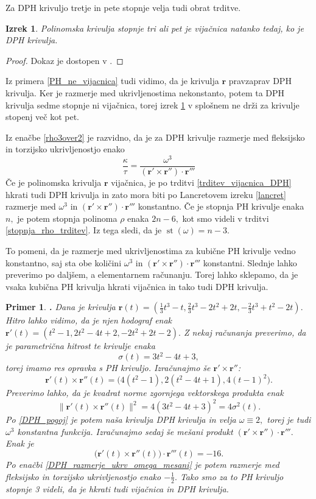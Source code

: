 \documentclass[12pt,a4paper,twoside]{article}
\theoremstyle{definition} %
\theoremstyle{plain} %
\newtheorem{izrek}[definicija]{Izrek}
\theoremstyle{primerstyle}
\newtheorem{primer}[definicija]{Primer}
\numberwithin{equation}{section}  %
\newcommand{\rV}{\mathbf{r}}
\DeclareMathOperator{\st}{st}
\begin{document}
Za DPH krivuljo tretje in pete stopnje velja tudi obrat trditve.
\begin{izrek}
	\label{DPH_helix_3ali5}
	Polinomska krivulja stopnje tri ali pet je vijačnica natanko tedaj, ko je DPH krivulja.
\end{izrek}
\begin{proof}
	Dokaz je dostopen v \cite[str.\ 121]{beltranmonterde}.
\end{proof}
Iz primera \ref{PH_ne_vijacnica} tudi vidimo, da je krivulja $\rV$ pravzaprav DPH krivulja. Ker je razmerje med ukrivljenostima nekonstanto, potem ta DPH krivulja sedme stopnje ni vijačnica, torej izrek \ref{DPH_helix_3ali5} v splošnem ne drži za krivulje stopenj več kot pet.

Iz enačbe \eqref{rho3over2} je razvidno, da je za DPH krivulje razmerje med fleksijsko in torzijsko ukrivljenostjo enako
\begin{equation}
	\label{DPH_razmerje_ukrv_omega_mesani}
	\frac{\kappa}{\tau}=\frac{\omega^3}{(\rV'\times\rV'')\cdot\rV'''}%
\end{equation}
Če je polinomska krivulja $\rV$ vijačnica, je po trditvi \ref{trditev_vijacnica_DPH} hkrati tudi DPH krivulja in zato mora biti po Lancretovem izreku \ref{lancret} razmerje med $\omega^3$ in $(\rV'\times\rV'')\cdot\rV'''$ konstantno. Če je stopnja PH krivulje enaka $n,$ je potem stopnja polinoma $\rho	$ enaka $2n-6,$ kot smo videli v trditvi \ref{stopnja_rho_trditev}. Iz tega sledi, da je $\st(\omega)=n-3.$

To pomeni, da je razmerje med ukrivljenostima za kubične PH krivulje vedno konstantno, saj sta obe količini $\omega^3$ in $(\rV'\times\rV'')\cdot\rV'''$ konstantni. Slednje lahko preverimo po daljšem, a elementarnem računanju. Torej lahko sklepamo, da je vsaka kubična PH krivulja hkrati vijačnica in tako tudi DPH krivulja.
\begin{primer}
	\textbf{.} Dana je krivulja $\rV(t)=(\frac{1}{3}t^3-t,\frac{2}{3}t^3-2t^2+2t,-\frac{2}{3}t^3+t^2-2t).$ Hitro lahko vidimo, da je njen hodograf enak $\rV'(t)=(t^2-1,2t^2-4t+2,-2t^2+2t-2).$ Z nekaj računanja preverimo, da je parametrična hitrost te krivulje enaka
	$$\sigma(t)=3t^2-4t+3,$$
	torej imamo res opravka s PH krivuljo. Izračunajmo še $\rV'\times\rV''$:
	$$\rV'(t)\times\rV''(t)=\big(4(t^2-1),2(t^2-4t+1),4(t-1)^2\big).$$
	Preverimo lahko, da je kvadrat norme zgornjega vektorskega produkta enak
	$$\lVert\rV'(t)\times\rV''(t)\rVert^2=4(3t^2-4t+3)^2=4\sigma^2(t).$$
	Po \eqref{DPH_pogoj} je potem naša krivulja DPH krivulja in velja $\omega\equiv2,$ torej je tudi $\omega^3$ konstantna funkcija. Izračunajmo sedaj še mešani produkt $(\rV'\times\rV'')\cdot\rV'''.$ Enak je
	$$\big(\rV'(t)\times\rV''(t)\big)\cdot\rV'''(t)=-16.$$
	Po enačbi \eqref{DPH_razmerje_ukrv_omega_mesani} je potem razmerje med fleksijsko in torzijsko ukrivljenostjo enako $-\frac{1}{2}.$ Tako smo za to PH krivuljo stopnje 3 videli, da je hkrati tudi vijačnica in DPH krivulja.
\end{primer}
\end{document}
